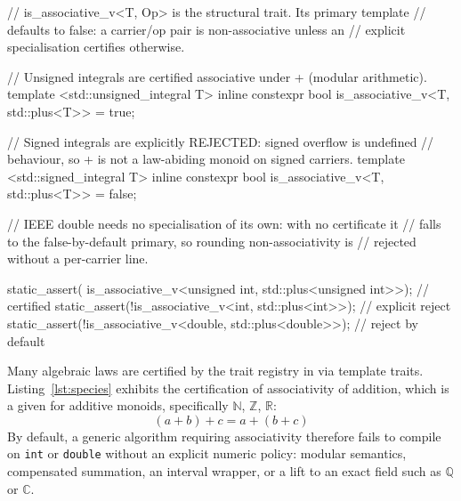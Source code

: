 \documentclass[11pt, a4paper]{article}
\begin{document}
\begin{listing}[htbp]
\caption{
The species registry records default algebraic properties (or their absence).
 types such as  are certified .
 types such as  are explicitly black-listed due to overflow.
 is rejected by the false-by-default policy, with no certificate of its own.}
\label{lst:species}
\begin{cpp}

// is_associative_v<T, Op> is the structural trait.  Its primary template
// defaults to false: a carrier/op pair is non-associative unless an
// explicit specialisation certifies otherwise.

// Unsigned integrals are certified associative under +  (modular arithmetic).
template <std::unsigned_integral T>
inline constexpr bool is_associative_v<T, std::plus<T>> = true;

// Signed integrals are explicitly REJECTED: signed overflow is undefined
// behaviour, so + is not a law-abiding monoid on signed carriers.
template <std::signed_integral T>
inline constexpr bool is_associative_v<T, std::plus<T>> = false;

// IEEE double needs no specialisation of its own: with no certificate it
// falls to the false-by-default primary, so rounding non-associativity is
// rejected without a per-carrier line.

static_assert( is_associative_v<unsigned int, std::plus<unsigned int>>);  // certified
static_assert(!is_associative_v<int,          std::plus<int>>);           // explicit reject
static_assert(!is_associative_v<double,       std::plus<double>>);        // reject by default
\end{cpp}
\end{listing}

Many algebraic laws are certified by the trait registry in  via  template traits.
Listing~\ref{lst:species} exhibits the certification of associativity of addition, which is a given for additive monoids, specifically $\mathbb{N}$, $\mathbb{Z}$, $\mathbb{R}$:
\begin{equation}
(a + b) + c = a + (b + c)
\end{equation}
By default, a generic algorithm requiring associativity therefore fails to compile on \texttt{int} or \texttt{double} without an explicit numeric policy: modular semantics, compensated summation, an interval wrapper, or a lift to an exact field such as $\mathbb{Q}$ or $\mathbb{C}$.
\end{document}
